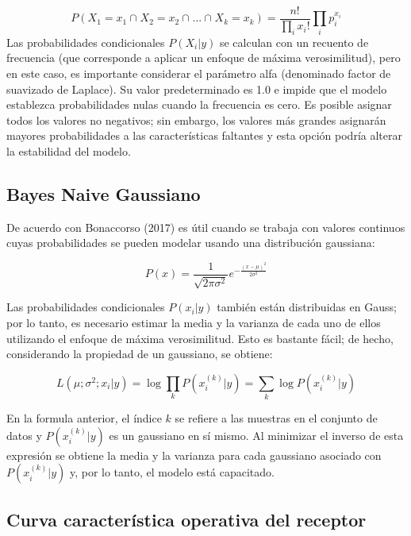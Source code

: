 \[
P\left(X_{1}=x_{1} \cap_{}^{} X_{2}=x_{2} \cap_{}^{} ... \cap_{}^{} X_{k}=x_{k} \right) = \frac{n!}{\prod_{i} x_{i}!} \prod_{i} p_{i}^{x_{i}}
\]
Las probabilidades condicionales $P\left(X_{i} | y\right)$ se calculan con un recuento de frecuencia (que corresponde a aplicar un enfoque de máxima verosimilitud), pero en este caso, es importante considerar el parámetro alfa (denominado factor de suavizado de Laplace). Su valor predeterminado es 1.0 e impide que el modelo establezca probabilidades nulas cuando la frecuencia es cero. Es posible asignar todos los valores no negativos; sin embargo, los valores más grandes asignarán mayores probabilidades a las características faltantes y esta opción podría alterar la estabilidad del modelo.

\subsection{Bayes Naive Gaussiano}

De acuerdo con Bonaccorso (2017) es útil cuando se trabaja con valores continuos cuyas probabilidades se pueden modelar usando una distribución gaussiana:

\[
P\left(x\right) = \frac{1}{\sqrt{2\pi\sigma^{2}}}e^{-\frac{\left(x-\mu\right)^{2}}{2\sigma^{2}}}
\]

Las probabilidades condicionales $P\left(x_{i} | y\right)$ también están distribuidas en Gauss; por lo tanto, es necesario estimar la media y la varianza de cada uno de ellos utilizando el enfoque de máxima verosimilitud. Esto es bastante fácil; de hecho, considerando la propiedad de un gaussiano, se obtiene:

\[
L\left(\mu;\sigma^{2};x_{i} | y\right)=\log\prod_{k}P\left(x_{i}^{\left(k\right)}|y\right)=\sum_{k}\log P\left(x_{i}^{\left(k\right)}|y\right)
\]

En la formula anterior, el índice $k$ se refiere a las muestras en el conjunto de datos y $P\left(x_{i}^{\left(k\right)}|y\right)$ es un gaussiano en sí mismo. Al minimizar el inverso de esta expresión se obtiene la media y la varianza para cada gaussiano asociado con $P\left(x_{i}^{\left(k\right)}|y\right)$ y, por lo tanto, el modelo está capacitado.

\subsection{Curva característica operativa del receptor}

